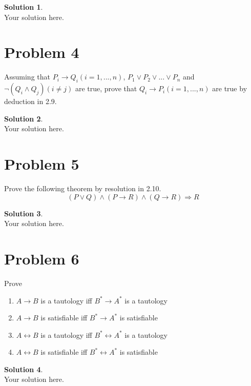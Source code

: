 \documentclass[a4paper,UTF8]{article}
\theoremstyle{definition}
\newtheorem*{solution}{Solution}
\begin{document}
\begin{solution}
~\\
Your solution here.
\end{solution}


\section*{Problem 4}
Assuming that $P_i\rightarrow Q_i(i=1,...,n)$, $P_1\vee P_2\vee...\vee P_n$ and $\neg(Q_i\wedge Q_j)(i\neq j)$ are true, prove that $Q_i\rightarrow P_i(i=1,...,n)$ are true by deduction in 2.9.

\begin{solution}
~\\
Your solution here.
\end{solution}


\section*{Problem 5}
Prove the following theorem by resolution in 2.10.
\[
(P\vee Q)\wedge(P\rightarrow R)\wedge(Q\rightarrow R)\Rightarrow R
\]

\begin{solution}
~\\
Your solution here.
\end{solution}

\section*{Problem 6}
Prove
\begin{enumerate}
\item $A\rightarrow B$ is a tautology iff $B^*\rightarrow A^*$ is a tautology
\item $A\rightarrow B$ is satisfiable iff $B^*\rightarrow A^*$ is satisfiable
\item $A\leftrightarrow B$ is a tautology iff $B^*\leftrightarrow A^*$ is a tautology
\item $A\leftrightarrow B$ is satisfiable iff $B^*\leftrightarrow A^*$ is satisfiable 
\end{enumerate}

\begin{solution}
~\\
Your solution here.
\end{solution}
\end{document}
